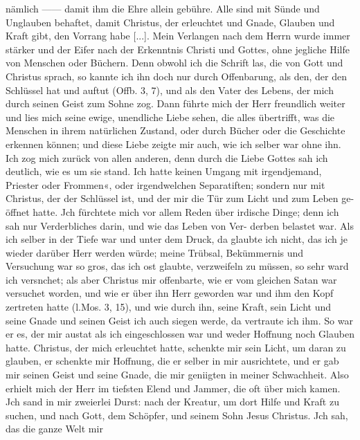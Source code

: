 nämlich —— damit ihm die Ehre allein gebühre. Alle sind mit
Sünde und Unglauben behaftet, damit Christus, der erleuchtet
und Gnade, Glauben und Kraft gibt, den Vorrang habe [...].
Mein Verlangen nach dem Herrn wurde immer stärker und der
Eifer nach der Erkenntnis Christi und Gottes, ohne jegliche Hilfe
von Menschen oder Büchern. Denn obwohl ich die Schrift las,
die von Gott und Christus sprach, so kannte ich ihn doch nur
durch Offenbarung, als den, der den Schlüssel hat und auftut
(Offb. 3, 7), und als den Vater des Lebens, der mich durch seinen
Geist zum Sohne zog. Dann führte mich der Herr freundlich
weiter und lies mich seine ewige, unendliche Liebe sehen, die
alles übertrifft, was die Menschen in ihrem natürlichen Zustand,
oder durch Bücher oder die Geschichte erkennen können;
und diese Liebe zeigte mir auch, wie ich selber war ohne ihn.
Ich zog mich zurück von allen anderen, denn durch die Liebe
Gottes sah ich deutlich, wie es um sie stand. Ich hatte keinen
Umgang mit irgendjemand, Priester oder Frommen«, oder
irgendwelchen Separatiften; sondern nur mit Christus, der der
Schlüssel ist, und der mir die Tür zum Licht und zum Leben ge-
öffnet hatte. Jch fürchtete mich vor allem Reden über irdische Dinge;
denn ich sah nur Verderbliches darin, und wie das Leben von Ver-
derben belastet war. Als ich selber in der Tiefe war und unter dem
Druck, da glaubte ich nicht, das ich je wieder darüber Herr werden
würde; meine Trübsal, Bekümmernis und Versuchung war so
gros, das ich ost glaubte, verzweifeln zu müssen, so sehr ward
ich versnchet; als aber Christus mir offenbarte, wie er vom gleichen
Satan war versuchet worden, und wie er über ihn Herr geworden
war und ihm den Kopf zertreten hatte (l.Mos. 3, 15), und wie durch
ihn, seine Kraft, sein Licht und seine Gnade und seinen Geist ich
auch siegen werde, da vertraute ich ihm. So war er es, der mir
austat als ich eingeschlossen war und weder Hoffnung noch Glauben
hatte. Christus, der mich erleuchtet hatte, schenkte mir sein Licht,
um daran zu glauben, er schenkte mir Hoffnung, die er selber in
mir ausrichtete, und er gab mir seinen Geist und seine Gnade,
die mir geniigten in meiner Schwachheit. Also erhielt mich der
Herr im tiefsten Elend und Jammer, die oft über mich kamen.
Jch sand in mir zweierlei Durst: nach der Kreatur, um dort
Hilfe und Kraft zu suchen, und nach Gott, dem Schöpfer, und
seinem Sohn Jesus Christus. Jch sah, das die ganze Welt mir



